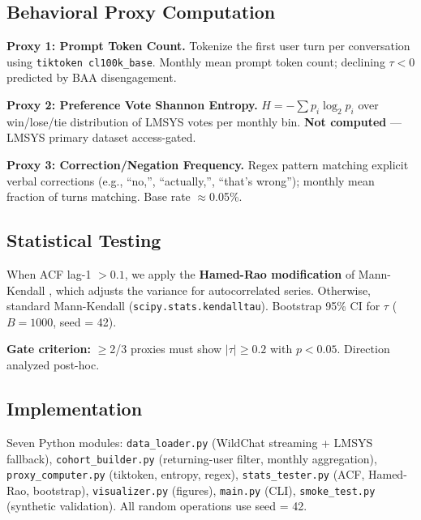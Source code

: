 \subsection{Behavioral Proxy Computation}

\textbf{Proxy 1: Prompt Token Count.} Tokenize the first user turn per conversation using \texttt{tiktoken cl100k\_base}. Monthly mean prompt token count; declining $\tau < 0$ predicted by BAA disengagement.

\textbf{Proxy 2: Preference Vote Shannon Entropy.} $H = -\sum p_i \log_2 p_i$ over win/lose/tie distribution of LMSYS votes per monthly bin. \textbf{Not computed} --- LMSYS primary dataset access-gated.

\textbf{Proxy 3: Correction/Negation Frequency.} Regex pattern matching explicit verbal corrections (e.g., ``no,'', ``actually,'', ``that's wrong''); monthly mean fraction of turns matching. Base rate $\approx$0.05\%.

\subsection{Statistical Testing}

When ACF lag-1 $> 0.1$, we apply the \textbf{Hamed-Rao modification} of Mann-Kendall \citep{Hamed1998Modified}, which adjusts the variance for autocorrelated series. Otherwise, standard Mann-Kendall (\texttt{scipy.stats.kendalltau}). Bootstrap 95\% CI for $\tau$ ($B = 1000$, seed = 42).

\textbf{Gate criterion:} $\geq$2/3 proxies must show $|\tau| \geq 0.2$ with $p < 0.05$. Direction analyzed post-hoc.

\subsection{Implementation}

Seven Python modules: \texttt{data\_loader.py} (WildChat streaming + LMSYS fallback), \texttt{cohort\_builder.py} (returning-user filter, monthly aggregation), \texttt{proxy\_computer.py} (tiktoken, entropy, regex), \texttt{stats\_tester.py} (ACF, Hamed-Rao, bootstrap), \texttt{visualizer.py} (figures), \texttt{main.py} (CLI), \texttt{smoke\_test.py} (synthetic validation). All random operations use seed = 42.
